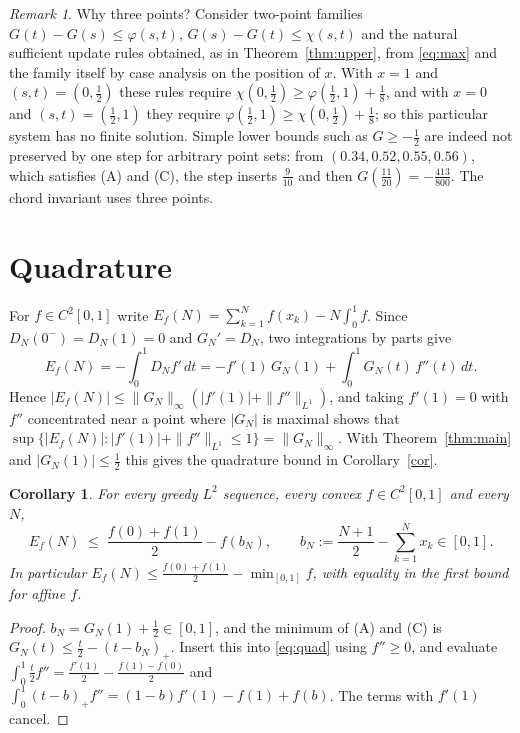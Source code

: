 \documentclass[11pt]{amsart}
\newtheorem{corollary}[theorem]{Corollary}
\theoremstyle{remark}
\newtheorem{remark}[theorem]{Remark}
\begin{document}
\begin{remark}
Why three points? Consider two-point families
$G(t)-G(s)\le\varphi(s,t)$, $G(s)-G(t)\le\chi(s,t)$ and the natural sufficient
update rules obtained, as in Theorem~\ref{thm:upper}, from \eqref{eq:max} and
the family itself by case analysis on the position of $x$. With $x=1$ and
$(s,t)=(0,\frac12)$ these rules require
$\chi(0,\frac12)\ge\varphi(\frac12,1)+\frac18$, and with $x=0$ and
$(s,t)=(\frac12,1)$ they require $\varphi(\frac12,1)\ge\chi(0,\frac12)+\frac18$;
so this particular system has no finite solution. Simple lower bounds such as
$G\ge-\frac12$ are indeed not preserved by one step for arbitrary point sets:
from $(0.34,0.52,0.55,0.56)$, which satisfies (A) and (C), the step inserts
$\frac9{10}$ and then $G(\frac{11}{20})=-\frac{413}{800}$. The chord invariant
uses three points.
\end{remark}

\section{Quadrature}\label{sec:quad}

For $f\in C^2[0,1]$ write $E_f(N)=\sum_{k=1}^N f(x_k)-N\int_0^1 f$. Since
$D_N(0^-)=D_N(1)=0$ and $G_N'=D_N$, two integrations by parts give
\begin{equation}\label{eq:quad}
E_f(N)=-\int_0^1 D_N f'\,dt=-f'(1)\,G_N(1)+\int_0^1 G_N(t)\,f''(t)\,dt .
\end{equation}
Hence $|E_f(N)|\le\|G_N\|_\infty(|f'(1)|+\|f''\|_{L^1})$, and taking $f'(1)=0$
with $f''$ concentrated near a point where $|G_N|$ is maximal shows that
$\sup\{|E_f(N)|:|f'(1)|+\|f''\|_{L^1}\le1\}=\|G_N\|_\infty$. With
Theorem~\ref{thm:main} and $|G_N(1)|\le\frac12$ this gives the quadrature bound
in Corollary~\ref{cor}.

\begin{corollary}\label{cor:convex}
For every greedy $L^2$ sequence, every convex $f\in C^2[0,1]$ and every $N$,
\[
E_f(N)\;\le\;\frac{f(0)+f(1)}{2}-f(b_N),
\qquad b_N:=\frac{N+1}{2}-\sum_{k=1}^N x_k\in[0,1].
\]
In particular $E_f(N)\le\frac{f(0)+f(1)}{2}-\min_{[0,1]}f$, with equality in
the first bound for affine $f$.
\end{corollary}

\begin{proof}
$b_N=G_N(1)+\tfrac12\in[0,1]$, and the minimum of (A) and (C) is
$G_N(t)\le \tfrac t2-(t-b_N)_+$. Insert this into \eqref{eq:quad} using
$f''\ge0$, and evaluate
$\int_0^1\tfrac t2 f''=\tfrac{f'(1)}{2}-\tfrac{f(1)-f(0)}{2}$ and
$\int_0^1(t-b)_+f''=(1-b)f'(1)-f(1)+f(b)$. The terms with $f'(1)$ cancel.
\end{proof}
\end{document}
